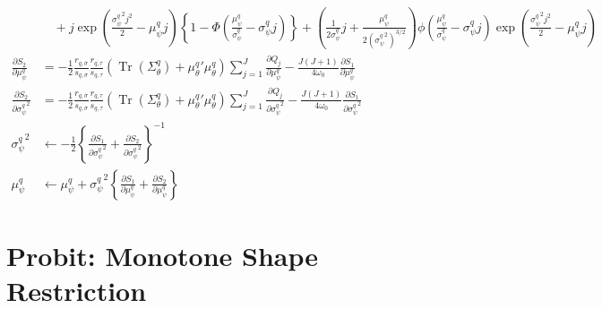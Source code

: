 \documentclass[11pt]{article}
\DeclareMathOperator{\Tr}{Tr}
\begin{document}
\begin{align*}
  &\quad +j\exp\left(\frac{{\sigma_{\psi}^{q}}^{2}j^{2}}{2}-\mu_{\psi}^{q}j \right)\left\{1-\Phi\left(\frac{\mu_{\psi}^{q}}{\sigma_{\psi}^{q}}-\sigma_{\psi}^{q}j\right) \right\}+\left(\frac{1}{2\sigma_{\psi}^{q}}j +\frac{\mu_{\psi}^{q}}{2\left({\sigma_{\psi}^{q}}^{2} \right)^{3/2}}\right)\phi\left(\frac{\mu_{\psi}^{q}}{\sigma_{\psi}^{q}}-\sigma_{\psi}^{q}j\right)\exp\left(\frac{{\sigma_{\psi}^{q}}^{2}j^{2}}{2} -\mu_{\psi}^{q}j \right)\\
  \frac{\partial S_{2}}{\partial \mu_{\psi}^{q}} &= -\frac{1}{2}\frac{r_{q,\sigma}}{s_{q,\sigma}}\frac{r_{q,\tau}}{s_{q,\tau}}\left(\Tr\left(\Sigma_{\theta}^{q}\right)+{\mu_{\theta}^{q}}'\mu_{\theta}^{q} \right)\sum_{j=1}^{J}\frac{\partial Q_{j}}{\partial \mu_{\psi}^{q}} -\frac{J\left(J+1\right)}{4\omega_{0}}\frac{\partial S_{1}}{\partial \mu_{\psi}^{q}}\\
  \frac{\partial S_{2}}{\partial {\sigma_{\psi}^{q}}^{2}} &= -\frac{1}{2}\frac{r_{q,\sigma}}{s_{q,\sigma}}\frac{r_{q,\tau}}{s_{q,\tau}}\left(\Tr\left(\Sigma_{\theta}^{q}\right)+{\mu_{\theta}^{q}}'\mu_{\theta}^{q} \right)\sum_{j=1}^{J}\frac{\partial Q_{j}}{\partial {\sigma_{\psi}^{q}}^{2}} -\frac{J\left(J+1\right)}{4\omega_{0}}\frac{\partial S_{1}}{\partial {\sigma_{\psi}^{q}}^{2}}\\
  {\sigma_{\psi}^{q}}^{2} &\leftarrow -\frac{1}{2}\left\{\frac{\partial S_{1}}{\partial {\sigma_{\psi}^{q}}^{2}}+\frac{\partial S_{2}}{\partial {\sigma_{\psi}^{q}}^{2}} \right\}^{-1}\\
  \mu_{\psi}^{q} &\leftarrow \mu_{\psi}^{q} +{\sigma_{\psi}^{q}}^{2}\left\{\frac{\partial S_{1}}{\partial \mu_{\psi}^{q}}+\frac{\partial S_{2}}{\partial \mu_{\psi}^{q}} \right\}
\end{align*}

\section{Probit: Monotone Shape Restriction}
\end{document}
